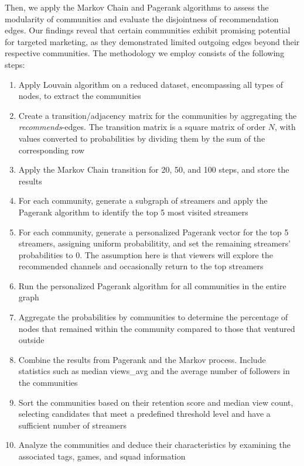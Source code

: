 \documentclass[11pt, oneside]{article}   	%
\begin{document}
Then, we apply the Markov Chain and Pagerank algorithms to assess the modularity of communities and evaluate the disjointness of recommendation edges. Our findings reveal that certain communities exhibit promising potential for targeted marketing, as they demonstrated limited outgoing edges beyond their respective communities. The methodology we employ consists of the following steps:

\begin{enumerate}
    \item Apply Louvain algorithm on a reduced dataset, encompassing all types of nodes, to extract the communities
    \item Create a transition/adjacency matrix for the communities by aggregating the \textit{recommends}-edges. The transition matrix is a square matrix of order $N$, with values converted to probabilities by dividing them by the sum of the corresponding row
    \item Apply the Markov Chain transition for 20, 50, and 100 steps, and store the results
    \item For each community, generate a subgraph of streamers and apply the Pagerank algorithm to identify the top 5 most visited streamers
    \item For each community, generate a personalized Pagerank vector for the top 5 streamers, assigning uniform probabilitity, and set the remaining streamers' probabilities to 0. The assumption here is that viewers will explore the recommended channels and occasionally return to the top streamers
    \item Run the personalized Pagerank algorithm for all communities in the entire graph
    \item Aggregate the probabilities by communities to determine the percentage of nodes that remained within the community compared to those that ventured outside
    \item Combine the results from Pagerank and the Markov process. Include statistics such as median views\_avg and the average number of followers in the communities
    \item Sort the communities based on their retention score and median view count, selecting candidates that meet a predefined threshold level and have a sufficient number of streamers
    \item Analyze the communities and deduce their characteristics by examining the associated tags, games, and squad information
\end{enumerate}
\end{document}
